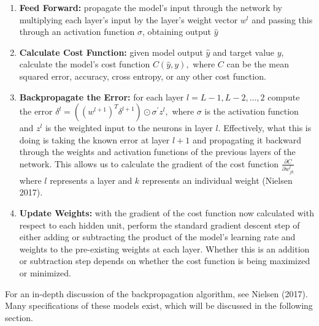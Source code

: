 \documentclass[12pt]{article}  %
\theoremstyle{definition}
\theoremstyle{remark}
\begin{document}
\begin{enumerate}[{1}]
   \item \textbf{Feed Forward:} propagate the model's input through the network by multiplying each layer's input by the layer's weight vector $w^l$ and passing this through an activation function $\sigma$, obtaining output $\hat{y}$
  
   \item \textbf{Calculate Cost Function:} given model output $\hat{y}$ and target value $y$, calculate the model's cost function $C(\hat{y}, y),$ where $C$ can be the mean squared error, accuracy, cross entropy, or any other cost function. 
 
   \item \textbf{Backpropagate the Error:} for each layer $l=L-1, L-2, ..., 2$ compute the error $\delta^{l}=((w^{l+1})^T\delta^{l+1})\odot \sigma^{\prime}z^{l},$ where $\sigma$ is the activation function and $z^l$ is the weighted input to the neurons in layer $l$. Effectively, what this is doing is taking the known error at layer $l+1$ and propagating it backward through the weights and activation functions of the previous layers of the network. This allows us to calculate the gradient of the cost function $\frac{\partial{C}}{\partial{w^{l}_{jk}}}$ where $l$ represents a layer and $k$ represents an individual weight (Nielsen 2017). 
    
   \item \textbf{Update Weights:} with the gradient of the cost function now calculated with respect to each hidden unit, perform the standard gradient descent step of either adding or subtracting the product of the model's learning rate and weights to the pre-existing weights at each layer. Whether this is an addition or subtraction step depends on whether the cost function is being maximized or minimized. 
\end{enumerate}

\par For an in-depth discussion of the backpropagation algorithm, see Nielsen (2017). Many specifications of these models exist, which will be discussed in the following section. 
\end{document}
